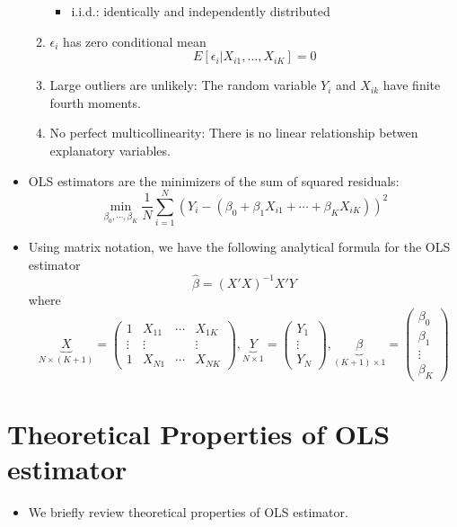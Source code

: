 \documentclass[]{book}
\providecommand{\tightlist}{%
  \setlength{\itemsep}{0pt}\setlength{\parskip}{0pt}}
\begin{document}
\begin{itemize}
\begin{enumerate}
    \begin{itemize}
    \tightlist
    \item
      i.i.d.: identically and independently distributed
    \end{itemize}
  \item
    \(\epsilon_i\) has zero conditional mean \[
      E[ \epsilon_i | X_{i1}, \ldots, X_{iK}] = 0
      \]
  \item
    Large outliers are unlikely: The random variable \(Y_i\) and
    \(X_{ik}\) have finite fourth moments.
  \item
    No perfect multicollinearity: There is no linear relationship betwen
    explanatory variables.
  \end{enumerate}
\item
  OLS estimators are the minimizers of the sum of squared residuals: \[
  \min_{\beta_0, \cdots, \beta_K} \frac{1}{N} \sum_{i=1}^N (Y_i - (\beta_0 + \beta_1 X_{i1} + \cdots + \beta_K X_{iK}))^2
  \]
\item
  Using matrix notation, we have the following analytical formula for
  the OLS estimator \[
  \hat{\beta} = (X'X)^{-1} X'Y
  \] where \[
  \underbrace{X}_{N\times (K+1)}=\left(\begin{array}{cccc}
  1 & X_{11} & \cdots & X_{1K}\\
  \vdots & \vdots &  & \vdots\\
  1 & X_{N1} & \cdots & X_{NK}
  \end{array}\right),\underbrace{Y}_{N\times 1}=\left(\begin{array}{c}
  Y_{1}\\
  \vdots\\
  Y_{N}
  \end{array}\right),\underbrace{\beta}_{(K+1)\times 1}=\left(\begin{array}{c}
  \beta_{0}\\
  \beta_{1}\\
  \vdots\\
  \beta_{K}
  \end{array}\right)            
  \]
\end{itemize}

\section{Theoretical Properties of OLS
estimator}\label{theoretical-properties-of-ols-estimator}

\begin{itemize}
\tightlist
\item
  We briefly review theoretical properties of OLS estimator.
\end{itemize}
\end{document}
